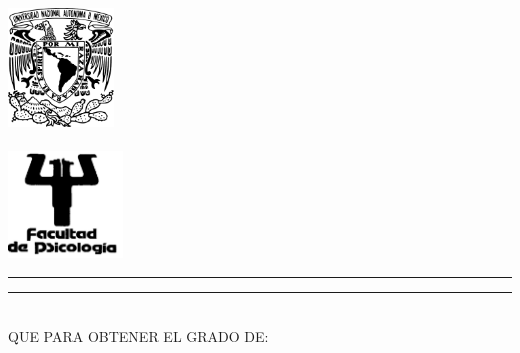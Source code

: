 \documentclass[
12pt, %
spanish, %
singlespacing, %
headsepline, %
]{Tesis_Lab25} %
\author{Jaime Osvaldo Islas Farías}%
\begin{document}
\frontmatter %

\pagestyle{plain} %


\begin{titlepage}
\begin{minipage}[c][9in][s]{1in}
\centering
\hspace*{-0.2in} \includegraphics[width=1.1in]{Escudo-UNAM}\\[10pt]
\hskip 2pt\vrule width 2pt height 6.7in
\hskip 1mm\vrule width 1pt height 6.7in\\[10pt]
\hspace*{-0.2in} \includegraphics[width=1.2in]{PSI}
\end{minipage}\hskip 10pt
\begin{minipage}[c][\textheight][s]{5.125in}
\centering
{\Large\scshape\univname}
\vspace{3mm}\hrule height2pt
\vspace{1mm}\hrule height1pt
\vspace{3mm}
{\scshape\facname}\par
\vfill\vfill
{\def\baselinestretch{1}\LARGE\scshape\ttitle\par}
\vfill\vfill
\\[8pt]
QUE PARA OBTENER EL GRADO DE:\\[8pt]
{\scshape\degreename}\\[16pt]

\end{minipage}
\end{titlepage}
\end{document}
